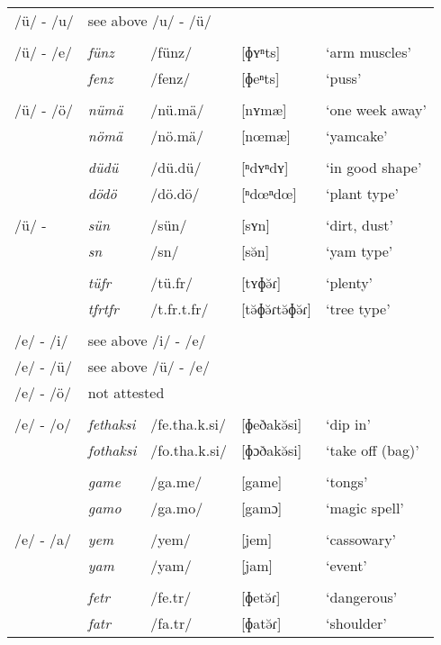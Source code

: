 \begin{longtable} {lllll}
		/ü/ - /u/ & \multicolumn{4}{l}{see above /u/ - /ü/}\\
		&&&&\\
		/ü/ - /e/ & \emph{fünz} & /fünz/ & [ɸʏⁿts] & `arm muscles'\\
		& \emph{fenz} & /fenz/ & [ɸeⁿts] & `puss'\\
		&&&&\\
		/ü/ - /ö/ & \emph{nümä} & /nü.mä/ & [nʏmæ] & `one week away'\\
		& \emph{nömä} & /nö.mä/ & [nœmæ] & `yamcake'\\
		&&&&\\
		& \emph{düdü} & /dü.dü/ & [ⁿdʏⁿdʏ] & `in good shape'\\
		& \emph{dödö} & /dö.dö/ & [ⁿdœⁿdœ] & `plant type'\\
		&&&&\\
		/ü/ - \Zero{} & \emph{sün} & /sün/ & [sʏn] & `dirt, dust'\\
		& \emph{sn} & /sn/ & [sə̆n] & `yam type'\\
		&&&&\\
		& \emph{tüfr} & /tü.fr/ & [tʏɸə̆ɾ] & `plenty'\\
		& \emph{tfrtfr} & /t.fr.t.fr/ & [tə̆ɸə̆ɾtə̆ɸə̆ɾ] & `tree type'\\
		&&&&\\
		/e/ - /i/ & \multicolumn{4}{l}{see above /i/ - /e/}\\
		/e/ - /ü/ & \multicolumn{4}{l}{see above /ü/ - /e/}\\
		/e/ - /ö/ & \multicolumn{4}{l}{not attested}\\
		&&&&\\
		/e/	- /o/ & \emph{fethaksi} & /fe.tha.k.si/ & [ɸeðakə̆si] & `dip in'\\
		& \emph{fothaksi} & /fo.tha.k.si/ & [ɸɔðakə̆si] & `take off (bag)'\\
		&&&&\\
		& \emph{game} & /ga.me/ & [{\ᵑ}game] & `tongs'\\
		& \emph{gamo} & /ga.mo/ & [{\ᵑ}gamɔ] & `magic spell'\\
		&&&&\\
		/e/ - /a/ & \emph{yem} & /yem/ & [jem] & `cassowary'\\
		& \emph{yam} & /yam/ & [jam] & `event'\\
		&&&&\\
		& \emph{fetr} & /fe.tr/ & [ɸetə̆ɾ] & `dangerous'\\
		& \emph{fatr} & /fa.tr/ & [ɸatə̆ɾ] & `shoulder'\\

\end{longtable}
